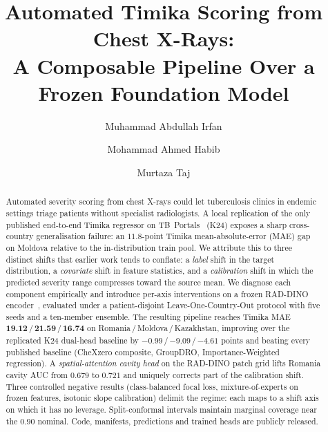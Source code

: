 \documentclass[runningheads]{llncs}
\begin{document}
\title{Automated Timika Scoring from Chest X-Rays:\\ A Composable Pipeline Over a Frozen Foundation Model}


\author{Muhammad Abdullah Irfan \and
Mohammad Ahmed Habib \and
Murtaza Taj}



\maketitle

\begin{abstract}
Automated severity scoring from chest X-rays could let tuberculosis clinics in endemic settings triage patients without specialist radiologists. A local replication of the only published end-to-end Timika regressor on TB~Portals~\cite{kantipudi2024} (K24) exposes a sharp cross-country generalisation failure: an $11.8$-point Timika mean-absolute-error (MAE) gap on Moldova relative to the in-distribution train pool. We attribute this to three distinct shifts that earlier work tends to conflate: a \emph{label} shift in the target distribution, a \emph{covariate} shift in feature statistics, and a \emph{calibration} shift in which the predicted severity range compresses toward the source mean. We diagnose each component empirically and introduce per-axis interventions on a frozen RAD-DINO encoder~\cite{perez2024raddino}, evaluated under a patient-disjoint Leave-One-Country-Out protocol with five seeds and a ten-member ensemble. The resulting pipeline reaches Timika MAE \textbf{19.12}\,/\,\textbf{21.59}\,/\,\textbf{16.74} on Romania\,/\,Moldova\,/\,Kazakhstan, improving over the replicated K24 dual-head baseline by $-0.99$\,/\,$-9.09$\,/\,$-4.61$ points and beating every published baseline (CheXzero composite, GroupDRO, Importance-Weighted regression). A \emph{spatial-attention cavity head} on the RAD-DINO patch grid lifts Romania cavity AUC from $0.679$ to $0.721$ and uniquely corrects part of the calibration shift. Three controlled negative results (class-balanced focal loss, mixture-of-experts on frozen features, isotonic slope calibration) delimit the regime: each maps to a shift axis on which it has no leverage. Split-conformal intervals maintain marginal coverage near the $0.90$ nominal. Code, manifests, predictions and trained heads are publicly released.
\end{abstract}
\end{document}
